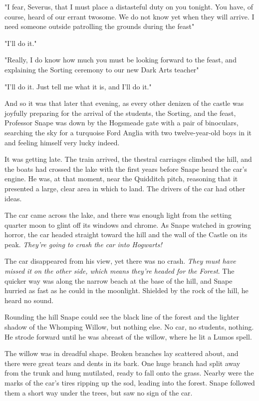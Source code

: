 "I fear, Severus, that I must place a distasteful duty on you tonight. You have, of course, heard of our errant twosome. We do not know yet when they will arrive. I need someone outside patrolling the grounds during the feast{\el}"

"I'll do it."

"Really, I do know how much you must be looking forward to the feast, and explaining the Sorting ceremony to our new Dark Arts teacher{\el}"

"I'll do it. Just tell me what it is, and I'll do it."

And so it was that later that evening, as every other denizen of the castle was joyfully preparing for the arrival of the students, the Sorting, and the feast, Professor Snape was down by the Hogsmeade gate with a pair of binoculars, searching the sky for a turquoise Ford Anglia with two twelve-year-old boys in it and feeling himself very lucky indeed.

It was getting late. The train arrived, the thestral carriages climbed the hill, and the boats had crossed the lake with the first years before Snape heard the car's engine. He was, at that moment, near the Quidditch pitch, reasoning that it presented a large, clear area in which to land. The drivers of the car had other ideas.

The car came across the lake, and there was enough light from the setting quarter moon to glint off its windows and chrome. As Snape watched in growing horror, the car headed straight toward the hill and the wall of the Castle on its peak. \emph{They're going to crash the car into Hogwarts!}

The car disappeared from his view, yet there was no crash. \emph{They must have missed it on the other side, which means they're headed for the Forest}. The quicker way was along the narrow beach at the base of the hill, and Snape hurried as fast as he could in the moonlight. Shielded by the rock of the hill, he heard no sound.

Rounding the hill Snape could see the black line of the forest and the lighter shadow of the Whomping Willow, but nothing else. No car, no students, nothing. He strode forward until he was abreast of the willow, where he lit a Lumos spell.

The willow was in dreadful shape. Broken branches lay scattered about, and there were great tears and dents in its bark. One huge branch had split away from the trunk and hung mutilated, ready to fall onto the grass. Nearby were the marks of the car's tires ripping up the sod, leading into the forest. Snape followed them a short way under the trees, but saw no sign of the car.

